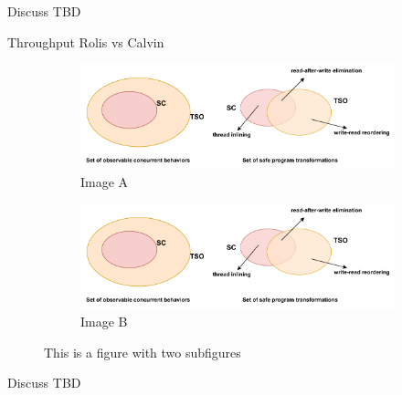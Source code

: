 \documentclass[notes, xcolor=dvipsnames]{beamer}
\begin{document}
    \begin{frame}{Discuss}
        TBD
    \end{frame}


    \begin{frame}{Throughput  Rolis vs Calvin}
        \begin{figure}
            \begin{subfigure}[h]{0.4\linewidth}
                \includegraphics[width=\linewidth]{sample.pdf}
                \caption{Image A}
            \end{subfigure}
                \hfill
                \begin{subfigure}[h]{0.4\linewidth}
                \includegraphics[width=\linewidth]{sample.pdf}
                \caption{Image B}
            \end{subfigure}%
            \caption{This is a figure with two subfigures}
        \end{figure}

    \end{frame}

    \begin{frame}{Discuss}
        TBD
    \end{frame}
\end{document}
